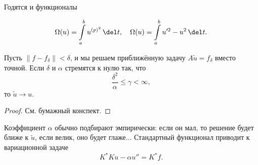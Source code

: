 \documentclass{trlnotes}
\begin{document}
    Годятся и функционалы

    \[
        \Omega(u) = \int\limits_a^b u^{(p)^2} \, \del t, \quad \Omega(u) = \int\limits_a^b u'^2 - u^2 \, \del t.
    \]

    \begin{thm}
        Пусть $\|f - f_{\delta}\| < \delta$, и мы решаем приближённую задачу $A\tilde{u} = f_{\delta}$ вместо точной. Если $\delta$ и $\alpha$ стремятся к нулю так, что 
        \[
            \dfrac{\delta^2}{\alpha} \leqslant \gamma < \infty,
        \]
        то $\tilde{u} \to u$.
        \begin{proof}
            См. бумажный конспект.
        \end{proof}
    \end{thm}

    Коэффициент $\alpha$ обычно подбирают эмпирически: если он мал, то решение будет ближе к $\tilde{u}$, если велик, оно будет глаже... Стандартный функционал приводит к вариационной задаче
    \[
        K^*Ku - \alpha u'' = K^* f.
    \]
\end{document}
